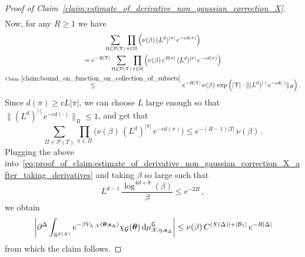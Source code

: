 \documentclass[11pt]{article}
\theoremstyle{definition}
\theoremstyle{remark}
\numberwithin{theorem}{section}
\newcommand{\bR}{\mathbb R}
\newcommand{\cE}{\mathcal{E}}
\begin{document}
\begin{proof}[Proof of Claim~\ref{claim:estimate_of_derivative_non_gaussian_correction_X}]
\begin{multline}
         \end{multline}
         Now, for any $R \ge 1$ we have 
         \begin{multline*}
             \sum_{\Pi\in \mathcal{P}(\Upsilon)} \prod_{\pi\in \Pi} \Big(\nu(\beta) \, (L^d)^{|\pi|} \,  e^{-c d(\pi)}\Big) \\ = e^{-R|\Upsilon|} \sum_{\Pi\in \mathcal{P}(\Upsilon)} \prod_{\pi\in \Pi} \Big(\nu(\beta) \, e^{R|\pi|} \, (L^d)^{|\pi|} \,  e^{-c d(\pi)}\Big)  \\ \stackrel{\text{Claim}~\ref{claim:bound_on_function_on_collection_of_subsets}}{\le} e^{-R|\Upsilon|} \,  \nu(\beta) \,  \exp\Big(|\Upsilon| \cdot  \| (L^d)^{|\cdot|} \, e^{-cd(\cdot)} \|_{R}\Big) \, .
         \end{multline*}
         Since $d(\pi) \ge c L |\pi|$, we can choose $L$ large enough so that $\|(L^d)^{|\cdot|} \,  e^{-cd(\cdot)} \|_{R} \le 1$, and get that 
         \[
           \sum_{\Pi\in \mathcal{P}(\Upsilon)} \prod_{\pi\in \Pi} \Big(\nu(\beta) \, (L^d)^{|\pi|} \,  e^{-c d(\pi)}\Big)  \le e^{-(R-1)|\Upsilon|} \,  \nu(\beta) \, . 
         \]
         Plugging the above into~\eqref{eq:proof_of_claim:estimate_of_derivative_non_gaussian_correction_X_after_taking_derivatives} and taking $\beta$ so large such that 
         \[
         L^{d-1} \, \frac{\log^{4d+8}(\beta)}{\beta} \le e^{-2R} \, ,
         \]
         we obtain
         \[
         \bigg|\partial^\Delta \int_{\bR^{\cE(\mathcal{X})}} e^{-\beta V_{\Lambda,\mathcal{X}}(\boldsymbol{\theta};\mathbf{s}_\Delta)} \chi_{\mathcal{G}}(\boldsymbol{\theta}) \, {\rm d}\mu_{\mathcal{X},\eta,\mathbf{s}_\Delta}^{\sf G} \bigg|  \le \nu(\beta) \, C^{|X(\Delta)| + |\mathcal{B}_1|}   \, e^{-R|\Delta|} 
         \]
         from which the claim follows. 
    \end{proof}
\end{document}
